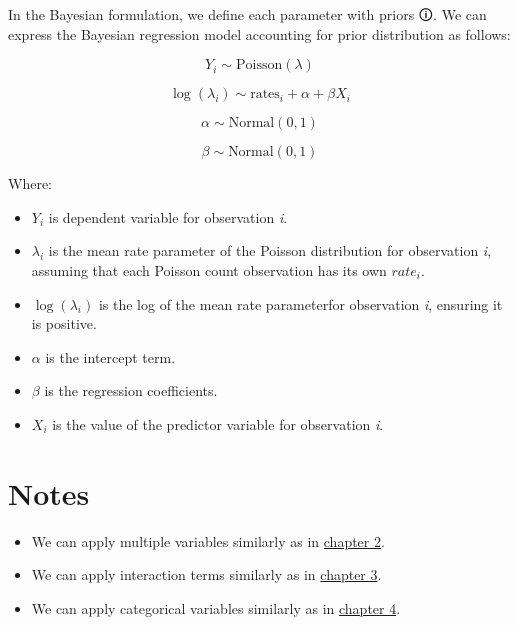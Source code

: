 \documentclass[
  letterpaper,
  DIV=11,
  numbers=noendperiod]{scrreprt}
\begin{document}
In the Bayesian formulation, we define each parameter with
\label{prior}{{priors 🛈}}. We can express the Bayesian
regression model accounting for prior distribution as follows:

\[
Y_i \sim \text{Poisson}(\lambda)
\]

\[
\log(\lambda_i) \sim \text{rates}_i + \alpha + \beta X_i
\]

\[
\alpha \sim \text{Normal}(0,1)
\]

\[
\beta \sim \text{Normal}(0,1)
\]

Where:

\begin{itemize}
\item
  \(Y_i\) is dependent variable for observation \emph{i}.
\item
  \(\lambda_i\) is the mean rate parameter of the Poisson distribution
  for observation \emph{i}, assuming that each Poisson count observation
  has its own \(rate_i\).
\item
  \(\log(\lambda_i)\) is the log of the mean rate parameterfor
  observation \emph{i}, ensuring it is positive.
\item
  \(\alpha\) is the intercept term.
\item
  \(\beta\) is the regression coefficients.
\item
  \(X_i\) is the value of the predictor variable for observation
  \emph{i}.
\end{itemize}

\section{Notes}\label{notes-3}

\begin{tcolorbox}[enhanced jigsaw, toptitle=1mm, opacityback=0, titlerule=0mm, breakable, bottomrule=.15mm, colframe=quarto-callout-note-color-frame, arc=.35mm, coltitle=black, left=2mm, opacitybacktitle=0.6, leftrule=.75mm, toprule=.15mm, rightrule=.15mm, bottomtitle=1mm, colbacktitle=quarto-callout-note-color!10!white, title=\textcolor{quarto-callout-note-color}{\faInfo}\hspace{0.5em}{Note}, colback=white]

\begin{itemize}
\item
  We can apply multiple variables similarly as in
  \href{2.\%20Multiple\%20Regression\%20for\%20Continuous\%20Variables.qmd}{chapter
  2}.
\item
  We can apply interaction terms similarly as in
  \href{3.\%20Interaction\%20between\%20Continuous\%20Variables.qmd}{chapter
  3}.
\item
  We can apply categorical variables similarly as in
  \href{4.\%20Categorical\%20variable.md}{chapter 4}.
\end{itemize}

\end{tcolorbox}
\end{document}
